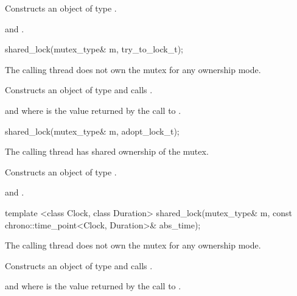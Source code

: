 \begin{itemdescr}
\pnum
\effects Constructs an object of type .

\pnum
\postconditions {} and .
\end{itemdescr}

%
\begin{itemdecl}
shared_lock(mutex_type& m, try_to_lock_t);
\end{itemdecl}

\begin{itemdescr}
\pnum
\requires The calling thread does not own the mutex for any ownership mode.

\pnum
\effects Constructs an object of type  and calls .

\pnum
\postconditions {} and  where  is the
value returned by the call to .
\end{itemdescr}

%
\begin{itemdecl}
shared_lock(mutex_type& m, adopt_lock_t);
\end{itemdecl}

\begin{itemdescr}
\pnum
\requires The calling thread has shared ownership of the mutex.

\pnum
\effects Constructs an object of type .

\pnum
\postconditions {} and .
\end{itemdescr}

%
\begin{itemdecl}
template <class Clock, class Duration>
  shared_lock(mutex_type& m,
              const chrono::time_point<Clock, Duration>& abs_time);
\end{itemdecl}

\begin{itemdescr}
\pnum
\requires The calling thread does not own the mutex for any ownership mode.

\pnum
\effects Constructs an object of type  and calls
.

\pnum
\postconditions {} and  where 
is the value returned by the call to .
\end{itemdescr}

